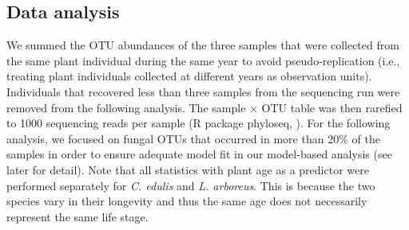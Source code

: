 \subsection*{Data analysis}
We summed the OTU abundances of the three samples that were collected from the same plant individual during the same year to avoid pseudo-replication (i.e., treating plant individuals collected at different years as observation units). Individuals that recovered less than three samples from the sequencing run were removed from the following analysis. 
The sample $\times$ OTU table was then rarefied to 1000 sequencing reads per sample (R package phyloseq, \citealp{McMurdie2013}). 
For the following analysis, we focused on fungal OTUs that occurred in more than 20$\%$ of the samples in order to ensure adequate model fit in our model-based analysis (see later for detail). 
Note that all statistics with plant age as a predictor were performed separately for \textit{C. edulis} and \textit{L. arboreus}. This is because the two species vary in their longevity and thus the same age does not necessarily represent the same life stage.
\par


